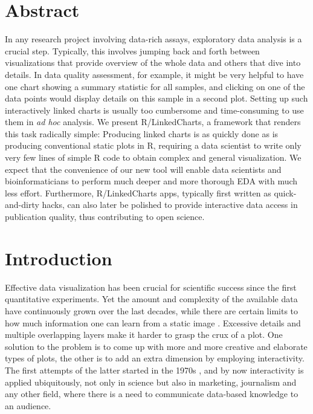\documentclass[twocolumn,10pt]{article}
\begin{document}
\setcounter{secnumdepth}{0}



\section{Abstract}
In any research project involving data-rich assays, exploratory data analysis is a crucial step. Typically, this involves jumping back and forth between visualizations that provide overview of the whole data and others that dive into details. In data quality assessment, for example, it might be very helpful to have one chart showing a summary statistic for all samples, and clicking on one of the data points would display details on this sample in a second plot. Setting up such interactively linked charts is usually too cumbersome and time-consuming to use them in \emph{ad hoc} analysis. We present R/LinkedCharts, a framework that renders this task radically simple: Producing linked charts is as quickly done as is producing conventional static plots in R, requiring a data scientist to write only very few lines of simple R code to obtain complex and general visualization. We expect that the convenience of our new tool will enable data scientists and bioinformaticians to perform much deeper and more thorough EDA with much less effort. Furthermore, R/LinkedCharts apps, typically first written as quick-and-dirty hacks, can also later be polished to provide interactive data access in publication quality, thus contributing to open science.

\section{Introduction}

Effective data visualization has been crucial for scientific success since the first quantitative experiments. Yet the amount and complexity of the available data have continuously grown over the last decades, while there are certain limits to how much information one can learn from a static image \citep{hegarty_2011}. Excessive details and multiple overlapping layers make it harder to grasp the crux of a plot. One solution to the problem is to come up with more and more creative and elaborate types of plots, the other is to add an extra dimension by employing interactivity. The first attempts of the latter started in the 1970s \citep{newman_1979, becker_1987}, and by now interactivity is applied ubiquitously, not only in science but also in marketing, journalism and any other field, where there is a need to communicate data-based knowledge to an audience.
\end{document}
